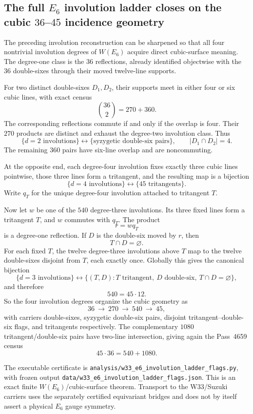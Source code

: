 \subsection{The full $E_6$ involution ladder closes on the cubic $36$--$45$ incidence geometry}
\label{sec:20260917-e6-involution-ladder-flags}

The preceding involution reconstruction can be sharpened so that all four
nontrivial involution degrees of $W(E_6)$ acquire direct cubic-surface meaning.
The degree-one class is the $36$ reflections, already identified objectwise with
the $36$ double-sixes through their moved twelve-line supports.

For two distinct double-sixes $D_1,D_2$, their supports meet in either four or
six cubic lines, with exact census
\[
 \binom{36}{2}=270+360.
\]
The corresponding reflections commute if and only if the overlap is four.
Their $270$ products are distinct and exhaust the degree-two involution class.
Thus
\[
 \boxed{\{d=2\text{ involutions}\}
 \longleftrightarrow
 \{\text{syzygetic double-six pairs}\}},
 \qquad |D_1\cap D_2|=4.
\]
The remaining $360$ pairs have six-line overlap and are noncommuting.

At the opposite end, each degree-four involution fixes exactly three cubic
lines pointwise, those three lines form a tritangent, and the resulting map is
a bijection
\[
 \boxed{\{d=4\text{ involutions}\}\longleftrightarrow
        \{45\text{ tritangents}\}}.
\]
Write $q_T$ for the unique degree-four involution attached to tritangent $T$.

Now let $w$ be one of the $540$ degree-three involutions.  Its three fixed
lines form a tritangent $T$, and $w$ commutes with $q_T$.  The product
\[
 r=wq_T
\]
is a degree-one reflection.  If $D$ is the double-six moved by $r$, then
\[
 T\cap D=\varnothing.
\]
For each fixed $T$, the twelve degree-three involutions above $T$ map to the
twelve double-sixes disjoint from $T$, each exactly once.  Globally this gives
the canonical bijection
\[
 \boxed{
 \{d=3\text{ involutions}\}
 \longleftrightarrow
 \{(T,D):T\text{ tritangent},\ D\text{ double-six},\ T\cap D=\varnothing\}},
\]
and therefore
\[
 \boxed{540=45\cdot12}.
\]
So the four involution degrees organize the cubic geometry as
\[
 36\ \longrightarrow\ 270\ \longrightarrow\ 540\ \longrightarrow\ 45,
\]
with carriers double-sixes, syzygetic double-six pairs, disjoint
tritangent--double-six flags, and tritangents respectively.  The complementary
$1080$ tritangent/double-six pairs have two-line intersection, giving again the
Pass~4659 census
\[
 45\cdot36=540+1080.
\]

The executable certificate is
\texttt{analysis/w33\_e6\_involution\_ladder\_flags.py}, with frozen output
\texttt{data/w33\_e6\_involution\_ladder\_flags.json}.  This is an exact finite
$W(E_6)$/cubic-surface theorem.  Transport to the W33/Suzuki carriers uses the
separately certified equivariant bridges and does not by itself assert a
physical $E_6$ gauge symmetry.

